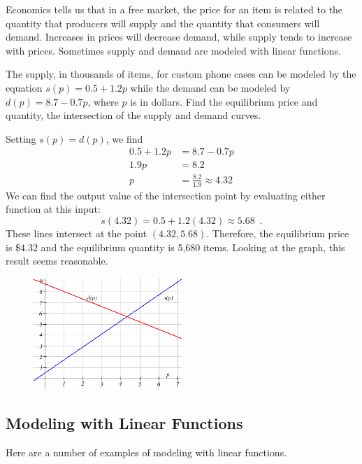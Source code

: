 Economics tells us that in a free market, the price for an item is related to the quantity that producers will supply and the quantity that consumers will demand. Increases in prices will decrease demand, while supply tends to increase with prices. Sometimes supply and demand are modeled with linear functions.
\begin{example}
  The supply, in thousands of items, for custom phone cases can be modeled by the equation $s(p)=0.5+1.2p$ while the demand can be modeled by $d(p)=8.7−0.7p$, where $p$ is in dollars. Find the equilibrium price and quantity, the intersection of the supply and demand curves.

  \begin{solution} Setting $s(p)=d(p)$, we find
  \begin{align*}
    0.5 + 1.2p &= 8.7−0.7p \\
    1.9p &= 8.2 \\
    p&=\frac{8.2}{1.9} \approx 4.32
  \end{align*}
  We can find the output value of the intersection point by evaluating either function at this input:
  $$ s(4.32) = 0.5+1.2(4.32) \approx 5.68 \enspace .$$
  These lines intersect at the point $(4.32, 5.68)$. Therefore, the equilibrium price is \$4.32 and the equilibrium quantity is 5,680 items. Looking at the graph, this result seems reasonable.
  \begin{figure}[!ht]
  \centering
  \includegraphics[width=0.5\textwidth]{img/chap1/sec1-4/image053.png}
  \caption{}
  \end{figure}
\end{solution}\end{example}

\subsection{Modeling with Linear Functions}
\label{ssec:modeling-linear}

Here are a number of examples of modeling with linear functions.

